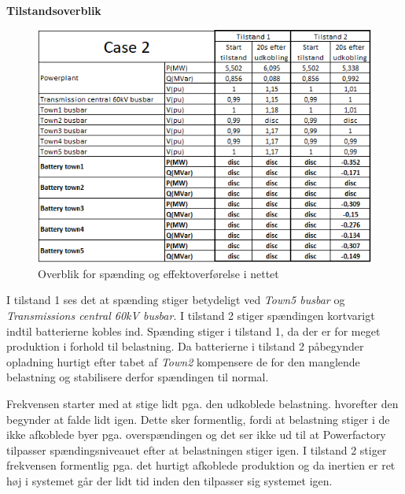 \textbf{Tilstandsoverblik}
\begin{figure}[H] %
	\centering
	\includegraphics[width=1\textwidth]{figurer/LossOfTown/Overview}
	\caption{Overblik for spænding og effektoverførelse i nettet}
	\label{fig:C2Overview}
\end{figure}

I tilstand 1 ses det at spænding stiger betydeligt ved \textit{Town5 busbar} og \textit{Transmissions central 60kV busbar}. I tilstand 2 stiger spændingen kortvarigt indtil batterierne kobles ind. Spænding stiger i tilstand 1, da der er for meget produktion i forhold til belastning. Da batterierne i tilstand 2 påbegynder opladning hurtigt efter tabet af \textit{Town2} kompensere de for den manglende belastning og stabilisere derfor spændingen til normal.

Frekvensen starter med at stige lidt pga. den udkoblede belastning. hvorefter den begynder at falde lidt igen. Dette sker formentlig, fordi at belastning stiger i de ikke afkoblede byer pga. overspændingen og det ser ikke ud til at Powerfactory tilpasser spændingsniveauet efter at belastningen stiger igen. I tilstand 2 stiger frekvensen formentlig pga. det hurtigt afkoblede produktion og da inertien er ret høj i systemet går der lidt tid inden den tilpasser sig systemet igen.
  
